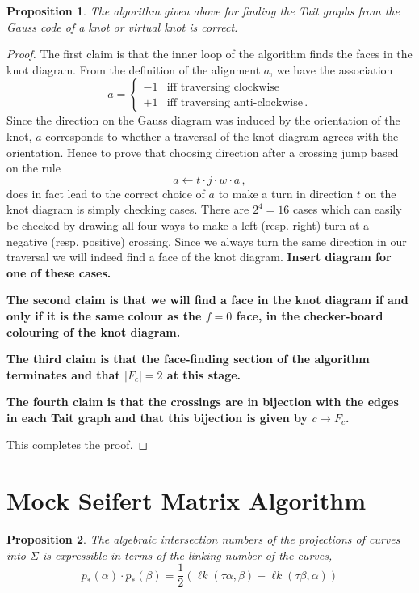 \documentclass[12pt]{report}
\newcommand{\lk}{\operatorname{\ell\textit{k}}}
\newcommand{\notegreen}[1]{{\color{Green} \textbf{#1}}}
\newtheorem*{proposition}{Proposition}
\begin{document}
	\begin{proposition}
		The algorithm given above for finding the Tait graphs from the Gauss code of a knot or virtual knot is correct.
	\end{proposition}
	\begin{proof}
		The first claim is that the inner loop of the algorithm finds the faces in the knot diagram. From the definition of the alignment $a$, we have the association
		\[a = \begin{cases}
			-1 & \text{iff traversing clockwise} \\
			+1 & \text{iff traversing anti-clockwise}\,.
		\end{cases}\]
		Since the direction on the Gauss diagram was induced by the orientation of the knot, $a$ corresponds to whether a traversal of the knot diagram agrees with the orientation. Hence to prove that choosing direction after a crossing jump based on the rule
		\[a \leftarrow t \cdot j \cdot w \cdot a\,,\]
		does in fact lead to the correct choice of $a$ to make a turn in direction $t$ on the knot diagram is simply checking cases. There are $2^{4} = 16$ cases which can easily be checked by drawing all four ways to make a left (resp. right) turn at a negative (resp. positive) crossing. Since we always turn the same direction in our traversal we will indeed find a face of the knot diagram. \notegreen{Insert diagram for one of these cases.}
		
		\notegreen{The second claim is that we will find a face in the knot diagram if and only if it is the same colour as the $f = 0$ face, in the checker-board colouring of the knot diagram.}
		
		\notegreen{The third claim is that the face-finding section of the algorithm terminates and that $|F_{c}| = 2$ at this stage.}
		
		\notegreen{The fourth claim is that the crossings are in bijection with the edges in each Tait graph and that this bijection is given by $c \mapsto F_{c}$.}
		
		This completes the proof. \qedhere
		
	\end{proof}

\section{Mock Seifert Matrix Algorithm}

\begin{proposition}
	The algebraic intersection numbers of the projections of curves into $\Sigma$ is expressible in terms of the linking number of the curves,
	\[p_{*}(\alpha) \cdot p_{*}(\beta) = \dfrac{1}{2}\left(\lk(\tau \alpha, \beta) - \lk(\tau \beta, \alpha)\right)\]
\end{proposition}
\end{document}
